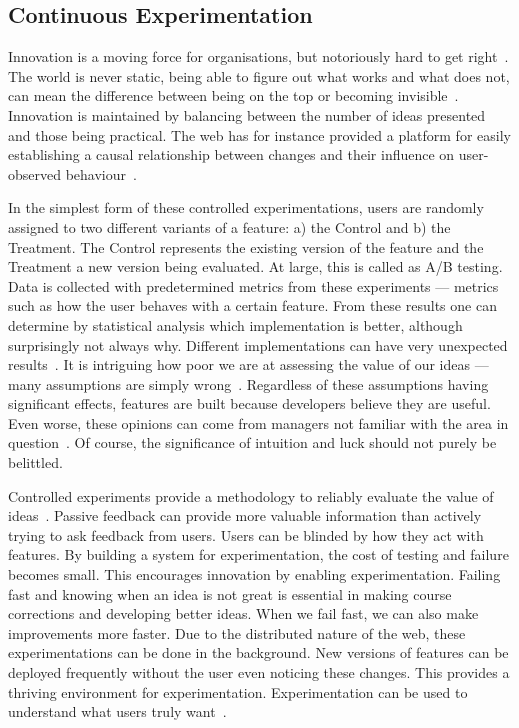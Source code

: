\documentclass[english]{tktltiki2}
\begin{document}
\subsection{Continuous Experimentation}

Innovation is a moving force for organisations, but notoriously hard to get right~\cite{BE12}. The world is never static, being able to figure out what works and what does not, can mean the difference between being on the top or becoming invisible~\cite{KLS09}. Innovation is maintained by balancing between the number of ideas presented and those being practical. The web has for instance provided a platform for easily establishing a causal relationship between changes and their influence on user-observed behaviour~\cite{KLS09}.

In the simplest form of these controlled experimentations, users are randomly assigned to two different variants of a feature: a) the Control and b) the Treatment. The Control represents the existing version of the feature and the Treatment a new version being evaluated. At large, this is called as A/B testing. Data is collected with predetermined metrics from these experiments — metrics such as how the user behaves with a certain feature. From these results one can determine by statistical analysis which implementation is better, although surprisingly not always why. Different implementations can have very unexpected results~\cite{KLS09, KDF12, McK12}. It is intriguing how poor we are at assessing the value of our ideas — many assumptions are simply wrong~\cite{BE12, KDF12}. Regardless of these assumptions having significant effects, features are built because developers believe they are useful. Even worse, these opinions can come from managers not familiar with the area in question~\cite{KLS09, BE12, Bos12}. Of course, the significance of intuition and luck should not purely be belittled.

Controlled experiments provide a methodology to reliably evaluate the value of ideas~\cite{KR04, KLS09, McK12, Rho14, Wan14}. Passive feedback can provide more valuable information than actively trying to ask feedback from users. Users can be blinded by how they act with features. By building a system for experimentation, the cost of testing and failure becomes small. This encourages innovation by enabling experimentation. Failing fast and knowing when an idea is not great is essential in making course corrections and developing better ideas. When we fail fast, we can also make improvements more faster. Due to the distributed nature of the web, these experimentations can be done in the background. New versions of features can be deployed frequently without the user even noticing these changes. This provides a thriving environment for experimentation. Experimentation can be used to understand what users truly want~\cite{Wan14}.
\end{document}
